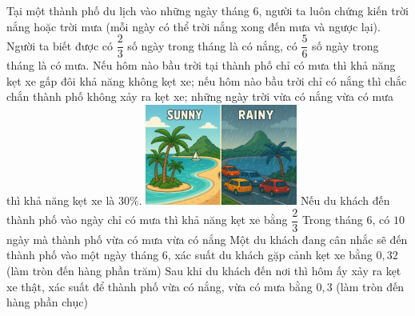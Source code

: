 \begin{ex}%
\immini
{
    Tại một thành phố du lịch vào những ngày tháng $6$, người ta luôn chứng kiến trời nắng hoặc trời mưa (mỗi ngày có thể trời nắng xong đến mưa và ngược lại). Người ta biết được có $\dfrac{2}{3}$ số ngày trong tháng là có nắng, có $\dfrac{5}{6}$ số ngày trong tháng là có mưa. Nếu hôm nào bầu trời tại thành phố chỉ có mưa thì khả năng kẹt xe gấp đôi khả năng không kẹt xe; nếu hôm nào bầu trời chỉ có nắng thì chắc chắn thành phố không xảy ra kẹt xe; những ngày trời vừa có nắng vừa có mưa thì khả năng kẹt xe là $30\%$.
}
{
    \includegraphics[width=5cm]{img/HXN-11-14}
}
 \choiceTF
 {\True Nếu du khách đến thành phố vào ngày chỉ có mưa thì khả năng kẹt xe bằng $\dfrac{2}{3}$}
 {Trong tháng 6, có $10$ ngày mà thành phố vừa có mưa vừa có nắng}
 {Một du khách đang cân nhắc sẽ đến thành phố vào một ngày tháng 6, xác suất du khách gặp cảnh kẹt xe bằng $ 0{,}32$ (làm tròn đến hàng phần trăm)}
 {Sau khi du khách đến nơi thì hôm ấy xảy ra kẹt xe thật, xác suất để thành phố vừa có nắng, vừa có mưa bằng $0{,}3$ (làm tròn đến hàng phần chục)}
\end{ex}

